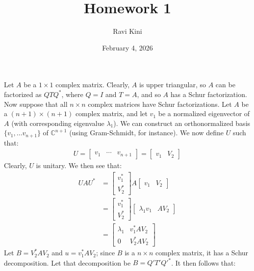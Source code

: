\documentclass{article}
\title{Homework 1}
\author{Ravi Kini}
\date{February 4, 2026}
\begin{document}
\maketitle

\problem{}
Let $A$ be a $1 \times 1$ complex matrix. Clearly, $A$ is upper triangular, so $A$ can be factorized as $QTQ^*$, where $Q = I$ and $T = A$, and so $A$ has a Schur factorization. Now suppose that all $n\times n$ complex matrices have Schur factorizations. Let $A$ be a $(n + 1)\times(n + 1)$ complex matrix, and let $v_1$ be a normalized eigenvector of $A$ (with corresponding eigenvalue $\lambda_1$). We can construct an orthonormalized basis $\{v_1, \ldots v_{n+1}\}$ of $\mathbb{C}^{n+1}$ (using Gram-Schmidt, for instance). We now define $U$ such that:
\begin{align*}
    U = \begin{bmatrix}
        v_1 & \cdots & v_{n+1}
    \end{bmatrix} = \begin{bmatrix}
        v_1 & V_2
    \end{bmatrix}
\end{align*}
Clearly, $U$ is unitary. We then see that:
\begin{align*}
    UAU^* & = \begin{bmatrix}
        v_1^* \\ V_2^*
    \end{bmatrix}A\begin{bmatrix}
        v_1 & V_2
    \end{bmatrix} \\
    & = \begin{bmatrix}
        v_1^* \\ V_2^*
    \end{bmatrix}\begin{bmatrix}
        \lambda_1v_1 & AV_2
    \end{bmatrix} \\
    & = \begin{bmatrix}
        \lambda_1 & v_1^*AV_2 \\ 0 & V_2^*AV_2
    \end{bmatrix}
\end{align*}
Let $B = V_2^*AV_2$ and $u = v_1^*AV_2$; since $B$ is a $n \times n$ complex matrix, it has a Schur decomposition. Let that decomposition be $B = Q'T'Q'^*$. It then follows that:
\end{document}
